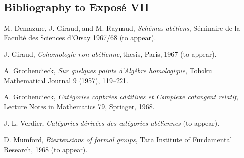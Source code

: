 \subsection*{Bibliography to Expos\'e VII}

\begin{enumerate}[label={[\arabic*]}]
\item M. Demazure, J. Giraud, and M. Raynaud,
\emph{Schémas abéliens}, Séminaire de la Faculté des Sciences
d'Orsay 1967/68 (to appear).
\item J. Giraud, \emph{Cohomologie non abélienne}, thesis, Paris,
1967 (to appear).
\item A. Grothendieck, \emph{Sur quelques points d'Algèbre
homologique}, Tohoku Mathematical Journal 9 (1957), 119--221.
\item A. Grothendieck, \emph{Catégories cofibrées additives et
Complexe cotangent relatif}, Lecture Notes in Mathematics 79,
Springer, 1968.
\item J.-L. Verdier, \emph{Catégories dérivées des catégories
abéliennes} (to appear).
\item D. Mumford, \emph{Biextensions of formal groups}, Tata
Institute of Fundamental Research, 1968 (to appear).
\end{enumerate}

